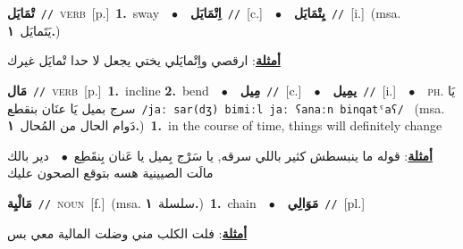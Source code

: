 \documentclass[10pt,a4paper,twoside]{article} %
\begin{document}
\begin{multicols}{2}
{\setlength\topsep{0pt}\textbf{\foreignlanguage{arabic}{تْمَايَل}}\ {\color{gray}\texttt{//}\color{black}}\ \textsc{verb}\ [p.]\ \textbf{1.}~sway\ \ $\bullet$\ \ \setlength\topsep{0pt}\textbf{\foreignlanguage{arabic}{اِتْمَايَل}}\ {\color{gray}\texttt{//}\color{black}}\ [c.]\ \ $\bullet$\ \ \setlength\topsep{0pt}\textbf{\foreignlanguage{arabic}{يِتْمَايَل}}\ {\color{gray}\texttt{//}\color{black}}\ [i.]\ \color{gray}(msa. \foreignlanguage{arabic}{يَتَمايَل}~\foreignlanguage{arabic}{\textbf{١.}})\color{black}\  \begin{flushright}\color{gray}\foreignlanguage{arabic}{\textbf{\underline{\foreignlanguage{arabic}{أمثلة}}}: ارقصي واِتْمايَلي يختي يجعل لا حدا تْمايَل غيرك}\end{flushright}\color{black}} \vspace{2mm}

{\setlength\topsep{0pt}\textbf{\foreignlanguage{arabic}{مَال}}\ {\color{gray}\texttt{//}\color{black}}\ \textsc{verb}\ [p.]\ \textbf{1.}~incline  \textbf{2.}~bend\ \ $\bullet$\ \ \setlength\topsep{0pt}\textbf{\foreignlanguage{arabic}{مِيل}}\ {\color{gray}\texttt{//}\color{black}}\ [c.]\ \ $\bullet$\ \ \setlength\topsep{0pt}\textbf{\foreignlanguage{arabic}{يمِيل}}\ {\color{gray}\texttt{//}\color{black}}\ [i.]\ \ $\bullet$\ \ \textsc{ph.} \color{gray} \foreignlanguage{arabic}{يَا سرج بميل يَا عنَان بنقطع}\color{black}\ {\color{gray}\texttt{/{\sffamily jaː sar(dʒ) bimiːl jaː ʕanaːn binqatˤaʕ}/}\color{black}}\ \color{gray} (msa. \foreignlanguage{arabic}{دَوام الحال من المُحال}~\foreignlanguage{arabic}{\textbf{١.}})\color{black}\ \textbf{1.}~in the course of time, things will definitely change\  \begin{flushright}\color{gray}\foreignlanguage{arabic}{\textbf{\underline{\foreignlanguage{arabic}{أمثلة}}}: قوله ما ينبسطش كثير باللي سرقه, يا سَرْج بِميل يا عَنان بِنقَطِع\ $\bullet$\ \  دير بالك مالَت الصيينية هسه بتوقع الصحون عليك}\end{flushright}\color{black}} \vspace{2mm}

{\setlength\topsep{0pt}\textbf{\foreignlanguage{arabic}{مَالْيِة}}\ {\color{gray}\texttt{//}\color{black}}\ \textsc{noun}\ [f.]\ \color{gray}(msa. \foreignlanguage{arabic}{سلسلة}~\foreignlanguage{arabic}{\textbf{١.}})\color{black}\ \textbf{1.}~chain\ \ $\bullet$\ \ \setlength\topsep{0pt}\textbf{\foreignlanguage{arabic}{مَوَالِي}}\ {\color{gray}\texttt{//}\color{black}}\ [pl.]\  \begin{flushright}\color{gray}\foreignlanguage{arabic}{\textbf{\underline{\foreignlanguage{arabic}{أمثلة}}}: فلت الكلب مني وضلت المالية معي بس}\end{flushright}\color{black}} \vspace{2mm}


\end{multicols}
\end{document}
